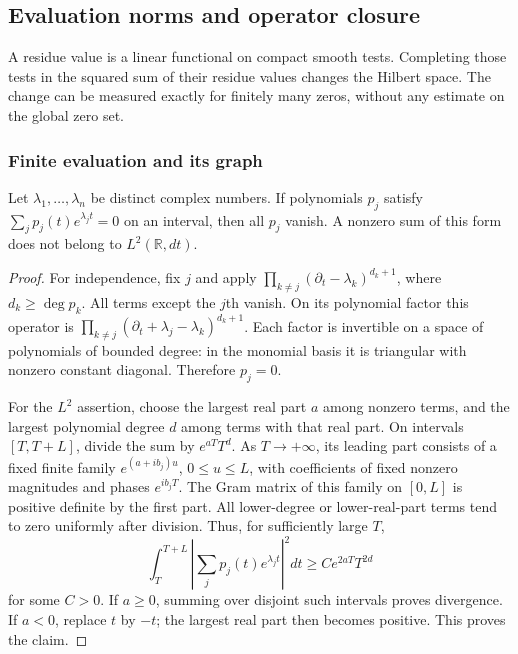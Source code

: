 \subsection{Evaluation norms and operator closure}

A residue value is a linear functional on compact smooth tests.
Completing those tests in the squared sum of their residue values
changes the Hilbert space. The change can be measured exactly for
finitely many zeros, without any estimate on the global zero set.

\subsubsection{Finite evaluation and its graph}

\begin{lemma}
\label{v4-arith:mo:exponential-polynomials}
Let $\lambda_1,\ldots,\lambda_n$ be distinct complex numbers.
If polynomials $p_j$ satisfy
$\sum_j p_j(t)e^{\lambda_jt}=0$ on an interval, then all $p_j$ vanish.
A nonzero sum of this form does not belong to $L^2(\mathbb R,dt)$.
\end{lemma}
\begin{proof}
For independence, fix $j$ and apply
$\prod_{k\ne j}(\partial_t-\lambda_k)^{d_k+1}$, where
$d_k\geq\deg p_k$. All terms except the $j$th vanish. On its
polynomial factor this operator is
$\prod_{k\ne j}(\partial_t+\lambda_j-\lambda_k)^{d_k+1}$.
Each factor is invertible on a space of polynomials of bounded
degree: in the monomial basis it is triangular with nonzero
constant diagonal. Therefore $p_j=0$.

For the $L^2$ assertion, choose the largest real part $a$ among
nonzero terms, and the largest polynomial degree $d$ among terms
with that real part. On intervals $[T,T+L]$, divide the sum by
$e^{aT}T^d$. As $T\to+\infty$, its leading part consists of a fixed
finite family $e^{(a+ib_j)u}$, $0\leq u\leq L$, with coefficients
of fixed nonzero magnitudes and phases $e^{ib_jT}$. The Gram
matrix of this family on $[0,L]$ is positive definite by the first
part. All lower-degree or lower-real-part terms tend to zero
uniformly after division. Thus, for sufficiently large $T$,
\[
 \int_T^{T+L}\left|\sum_jp_j(t)e^{\lambda_jt}\right|^2dt
 \geq C e^{2aT}T^{2d}
\]
for some $C>0$. If $a\geq0$, summing over disjoint such intervals
proves divergence. If $a<0$, replace $t$ by $-t$; the largest
real part then becomes positive. This proves the claim.
\end{proof}

